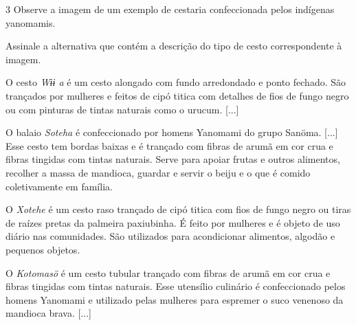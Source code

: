 \num{3}  Observe a imagem de um exemplo de cestaria confeccionada pelos
  indígenas yanomamis.


Assinale a alternativa que contém a descrição do tipo de cesto correspondente à imagem.

\begin{escolha}
\item
  O cesto \emph{Wɨɨ a} é um cesto alongado com fundo arredondado e ponto
  fechado. São trançados por mulheres e feitos de cipó titica com
  detalhes de fios de fungo negro ou com pinturas de tintas naturais
  como o urucum. {[}...{]}
\item
  O balaio \emph{Soteha} é confeccionado por homens Yanomami do grupo
  Sanöma. {[}...{]} Esse cesto tem bordas baixas e é trançado com fibras
  de arumã em cor crua e fibras tingidas com tintas naturais. Serve para
  apoiar frutas e outros alimentos, recolher a massa de mandioca,
  guardar e servir o beiju e o que é comido coletivamente em família.
\item
  O \emph{Xotehe} é um cesto raso trançado de cipó titica com fios de
  fungo negro ou tiras de raízes pretas da palmeira paxiubinha. É feito
  por mulheres e é objeto de uso diário nas comunidades. São utilizados
  para acondicionar alimentos, algodão e pequenos objetos.
\item
  O \emph{Kotomasö} é um cesto tubular trançado com fibras de arumã em
  cor crua e fibras tingidas com tintas naturais. Esse utensílio
  culinário é confeccionado pelos homens Yanomami e utilizado pelas
  mulheres para espremer o suco venenoso da mandioca brava. {[}...{]}
\end{escolha}



